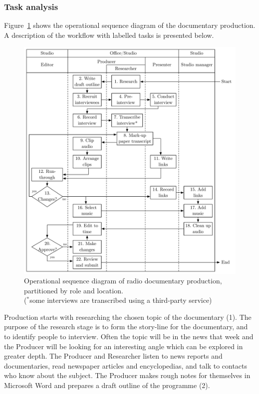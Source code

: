 \subsubsection{Task analysis}
Figure~\ref{fig:ethno-docs-workflow} shows the operational sequence diagram of the documentary production.  A
description of the workflow with labelled tasks is presented below.

\begin{figure}
  \centering
  \includegraphics[width=\columnwidth]{figs/docs-workflow.pdf}
  \caption[Operational sequence diagram of radio documentary production, partitioned by role and location.]{Operational
  sequence diagram of radio documentary production, partitioned by role and location.\\ {\footnotesize ($^{*}$some
  interviews are transcribed using a third-party service)}}
  \label{fig:ethno-docs-workflow}
\end{figure}

Production starts with researching the chosen topic of the documentary (1).  The purpose of the research stage is to
form the story-line for the documentary, and to identify people to interview.  Often the topic will be in the news that
week and the Producer will be looking for an interesting angle which can be explored in greater depth.  The Producer
and Researcher listen to news reports and documentaries, read newspaper articles and encyclopedias, and talk to
contacts who know about the subject.  The Producer makes rough notes for themselves in Microsoft Word and prepares a
draft outline of the programme (2).

